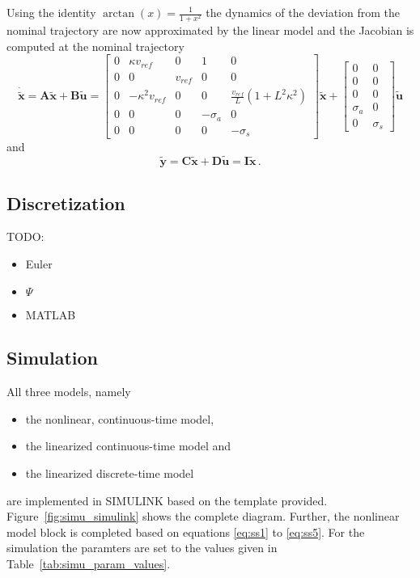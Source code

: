 \documentclass{scrartcl}
\newcommand{\bb}[1]{\boldsymbol{#1}}
\begin{document}
Using the identity $\arctan(x) = \frac{1}{1 + x^2}$ the dynamics of the deviation from the nominal trajectory are now approximated by the linear model and the Jacobian is computed at the nominal trajectory
\begin{equation}
	\bb{\dot{\tilde{x}}} = \mathbf{A}\bb{\tilde{x}} + \mathbf{B}\bb{\tilde{u}} = \begin{bmatrix}
		0 & \kappa v_{ref} & 0 & 1 & 0\\
		0 & 0 & v_{ref} & 0 & 0\\
		0 & -\kappa^2 v_{ref} & 0 & 0 & \frac{v_{ref}}{L} \left(1 + L^2 \kappa^2\right)\\
		0 & 0 & 0 & -\sigma_a & 0\\
		0 & 0 & 0 & 0 & -\sigma_s
	\end{bmatrix} \bb{\tilde{x}} + \begin{bmatrix}
		0&0\\
		0&0\\
		0&0\\
		\sigma_a & 0\\
		0 & \sigma_s
	\end{bmatrix} \bb{\tilde{u}}
\end{equation}
and
\begin{equation}
	\bb{\tilde{y}} = \mathbf{C}\bb{\tilde{x}} + \mathbf{D}\bb{\tilde{u}} = \mathbf{I}\bb{\tilde{x}}\, .
\end{equation}

\subsection{Discretization}
TODO:
\begin{itemize}
	\item Euler
	\item $\Psi$
	\item MATLAB
\end{itemize}

\subsection{Simulation}
All three models, namely
\begin{itemize}
	\item the nonlinear, continuous-time model,
	\item the linearized continuous-time model and
	\item the linearized discrete-time model
\end{itemize}
are implemented in SIMULINK based on the template provided. 
Figure~\ref{fig:simu_simulink} shows the complete diagram.
Further, the nonlinear model block is completed based on equations \eqref{eq:ss1} to \eqref{eq:ss5}.
For the simulation the paramters are set to the values given in Table~\ref{tab:simu_param_values}.
\end{document}
